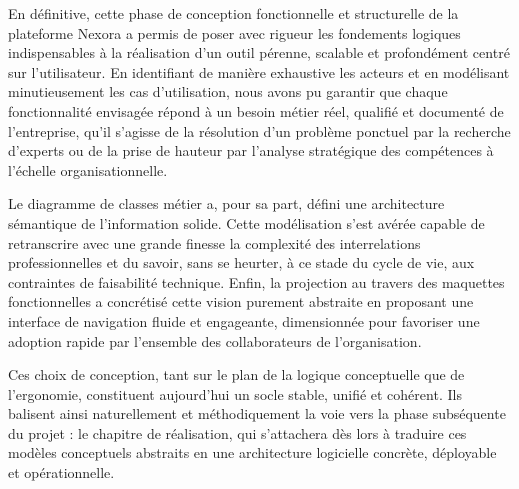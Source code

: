 \documentclass[12pt,a4paper]{article}
\begin{document}
En définitive, cette phase de conception fonctionnelle et structurelle de la plateforme Nexora a permis de poser avec rigueur les fondements logiques indispensables à la réalisation d'un outil pérenne, scalable et profondément centré sur l'utilisateur. En identifiant de manière exhaustive les acteurs et en modélisant minutieusement les cas d'utilisation, nous avons pu garantir que chaque fonctionnalité envisagée répond à un besoin métier réel, qualifié et documenté de l'entreprise, qu'il s'agisse de la résolution d'un problème ponctuel par la recherche d'experts ou de la prise de hauteur par l'analyse stratégique des compétences à l'échelle organisationnelle. 

Le diagramme de classes métier a, pour sa part, défini une architecture sémantique de l'information solide. Cette modélisation s'est avérée capable de retranscrire avec une grande finesse la complexité des interrelations professionnelles et du savoir, sans se heurter, à ce stade du cycle de vie, aux contraintes de faisabilité technique. Enfin, la projection au travers des maquettes fonctionnelles a concrétisé cette vision purement abstraite en proposant une interface de navigation fluide et engageante, dimensionnée pour favoriser une adoption rapide par l'ensemble des collaborateurs de l'organisation. 

Ces choix de conception, tant sur le plan de la logique conceptuelle que de l'ergonomie, constituent aujourd'hui un socle stable, unifié et cohérent. Ils balisent ainsi naturellement et méthodiquement la voie vers la phase subséquente du projet : le chapitre de réalisation, qui s'attachera dès lors à traduire ces modèles conceptuels abstraits en une architecture logicielle concrète, déployable et opérationnelle.
\end{document}
